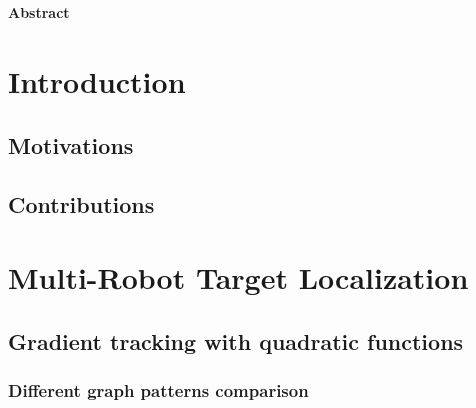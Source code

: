 \documentclass[a4paper,11pt,oneside]{book}
\begin{document}
\newpage
\thispagestyle{empty}

\begin{center}
\chapter*{}
\thispagestyle{empty}
{\Huge \textbf{Abstract}}\\
\vspace{15mm}
\end{center}

\tableofcontents \thispagestyle{empty}

\chapter*{Introduction}
\section*{Motivations} 

\section*{Contributions}


\chapter{Multi-Robot Target Localization}

\section{Gradient tracking with quadratic functions}


\subsection{Different graph patterns comparison}
\end{document}
